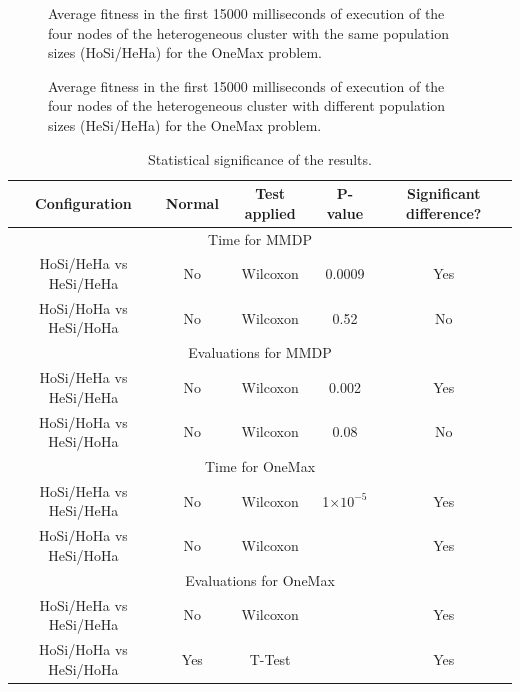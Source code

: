\documentclass[final,1p,times]{elsarticle}
\providecommand{\e}[1]{\ensuremath{\times 10^{#1}}}
\begin{document}
\begin{figure}[htb]
\centering
{}
\caption{Average fitness in the first 15000 milliseconds of execution of the four nodes of the heterogeneous cluster with the same population sizes (HoSi/HeHa) for the OneMax problem.}
\label{fig:gensonemaxhomosize}
\end{figure}

\begin{figure}[htb]
\centering
{}
\caption{Average fitness in the first 15000 milliseconds of execution of the four nodes of the heterogeneous cluster with different population sizes (HeSi/HeHa) for the OneMax problem.}
\label{fig:gensonemaxheterosize}
\end{figure}

\begin{table}
\centering
\caption{Statistical significance of the results.}
\begin{tabular}{|c|c|c|c|c|} \hline
Configuration     &Normal &Test applied     &P-value & Significant difference?\\ \hline
\multicolumn{5}{|c|}{Time for MMDP} \\ \hline
HoSi/HeHa vs HeSi/HeHa  &No  &Wilcoxon    & 0.0009    & Yes \\ \hline
HoSi/HoHa vs HeSi/HoHa  &No   &Wilcoxon   &0.52   & No \\ \hline \hline
\multicolumn{5}{|c|}{Evaluations for MMDP}  \\ \hline
HoSi/HeHa vs HeSi/HeHa  &No  &Wilcoxon     &0.002  & Yes \\ \hline
HoSi/HoHa vs HeSi/HoHa  &No   &Wilcoxon   &0.08  & No \\ \hline \hline
\multicolumn{5}{|c|}{Time for OneMax} \\ \hline
HoSi/HeHa vs HeSi/HeHa  & No & Wilcoxon    &  1\e{-5} & Yes \\ \hline
HoSi/HoHa vs HeSi/HoHa  & No  & Wilcoxon    &   & Yes \\ \hline \hline
\multicolumn{5}{|c|}{Evaluations for OneMax}  \\ \hline
HoSi/HeHa vs HeSi/HeHa  & No  & Wilcoxon    &  & Yes\\ \hline
HoSi/HoHa vs HeSi/HoHa  & Yes & T-Test    &   & Yes \\ \hline

\end{tabular}
\label{tab:significance}
\end{table}
\end{document}
